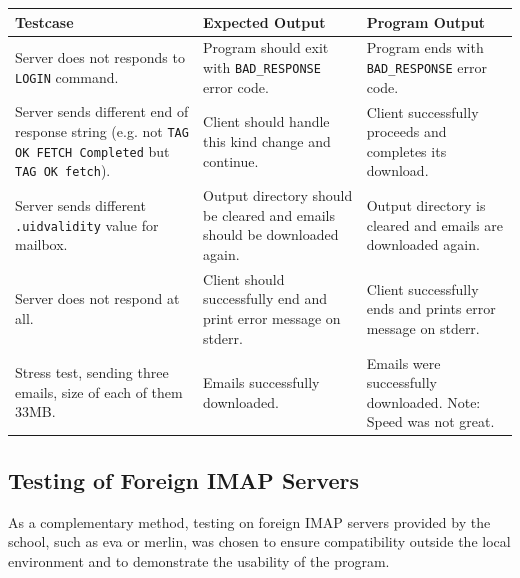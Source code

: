 \documentclass[a4paper,11pt]{article}
\begin{document}
\begin{center}
    \vspace{0.5cm} %
    \begin{tabularx}{\textwidth}{|>{\raggedright\arraybackslash}p{5cm}|>{\raggedright\arraybackslash}p{5cm}|>{\raggedright\arraybackslash}X|}
        \hline
        \textbf{Testcase} & \textbf{Expected Output} & \textbf{Program Output} \\
        \hline
        Server does not responds to \texttt{LOGIN} command. & Program should exit with \texttt{BAD\_RESPONSE} error code. & Program ends with \texttt{BAD\_RESPONSE} error code. \\
        \hline
        Server sends different end of response string (e.g. not \texttt{TAG OK FETCH Completed} but \texttt{TAG OK fetch}). & Client should handle this kind change and continue. & Client successfully proceeds and completes its download. \\
        \hline
        Server sends different \texttt{.uidvalidity} value for mailbox. & Output directory should be cleared and emails should be downloaded again. & Output directory is cleared and emails are downloaded again. \\
        \hline
        Server does not respond at all. & Client should successfully end and print error message on stderr. & Client successfully ends and prints error message on stderr.  \\
        \hline
        Stress test, sending three emails, size of each of them 33MB. & Emails successfully downloaded. & Emails were successfully downloaded. Note: Speed was not great. \\
        \hline
    \end{tabularx}
    \vspace{0.5cm} %
\end{center}


\subsection{Testing of Foreign IMAP Servers}
As a complementary method, testing on foreign IMAP servers provided by the school, such as eva 
or merlin, was chosen to ensure compatibility outside the local environment and to demonstrate 
the usability of the program.
\end{document}
